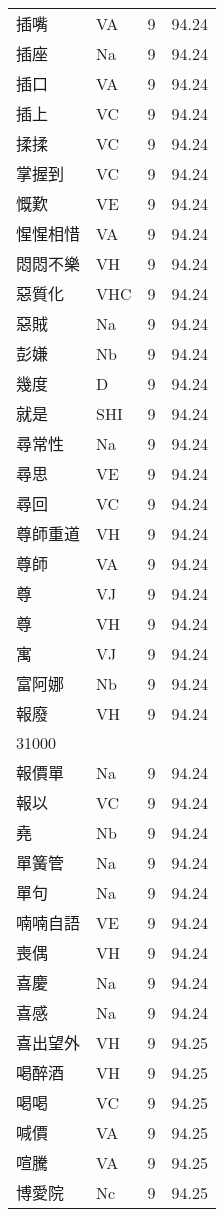 \documentclass[twocolumn]{book}
\begin{document}
\begin{supertabular}{llrr}
插嘴 & VA & 9 &  94.24\\
插座 & Na & 9 &  94.24\\
插口 & VA & 9 &  94.24\\
插上 & VC & 9 &  94.24\\
揉揉 & VC & 9 &  94.24\\
掌握到 & VC & 9 &  94.24\\
慨歎 & VE & 9 &  94.24\\
惺惺相惜 & VA & 9 &  94.24\\
悶悶不樂 & VH & 9 &  94.24\\
惡質化 & VHC & 9 &  94.24\\
惡賊 & Na & 9 &  94.24\\
彭嫌 & Nb & 9 &  94.24\\
幾度 & D & 9 &  94.24\\
就是 & SHI & 9 &  94.24\\
尋常性 & Na & 9 &  94.24\\
尋思 & VE & 9 &  94.24\\
尋回 & VC & 9 &  94.24\\
尊師重道 & VH & 9 &  94.24\\
尊師 & VA & 9 &  94.24\\
尊 & VJ & 9 &  94.24\\
尊 & VH & 9 &  94.24\\
寓 & VJ & 9 &  94.24\\
富阿娜 & Nb & 9 &  94.24\\
報廢 & VH & 9 &  94.24\\
31000\\
報價單 & Na & 9 &  94.24\\
報以 & VC & 9 &  94.24\\
堯 & Nb & 9 &  94.24\\
單簧管 & Na & 9 &  94.24\\
單句 & Na & 9 &  94.24\\
喃喃自語 & VE & 9 &  94.24\\
喪偶 & VH & 9 &  94.24\\
喜慶 & Na & 9 &  94.24\\
喜感 & Na & 9 &  94.24\\
喜出望外 & VH & 9 &  94.25\\
喝醉酒 & VH & 9 &  94.25\\
喝喝 & VC & 9 &  94.25\\
喊價 & VA & 9 &  94.25\\
喧騰 & VA & 9 &  94.25\\
博愛院 & Nc & 9 &  94.25\\

\end{supertabular}
\end{document}
